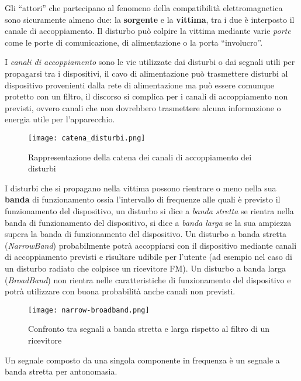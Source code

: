 Gli ``attori'' che partecipano al fenomeno della compatibilità elettromagnetica sono sicuramente
almeno due: la \textbf{sorgente} e la \textbf{vittima}, tra i due è interposto il canale di accoppiamento.
Il disturbo può colpire la vittima mediante varie \textit{porte} come le porte di comunicazione,
di alimentazione o la porta ``involucro''.

I \textit{canali di accoppiamento} sono le vie utilizzate dai disturbi o dai segnali utili per propagarsi tra i 
dispositivi, il cavo di alimentazione può trasmettere disturbi al dispositivo provenienti dalla rete di alimentazione
ma può essere comunque protetto con un filtro, il discorso si complica per i canali di accoppiamento non previsti,
ovvero canali che non dovrebbero trasmettere alcuna informazione o energia utile per l'apparecchio.

\begin{figure}[h]
 \texttt{[image: catena\_disturbi.png]}
 \centering
 \caption{Rappresentazione della catena dei canali di accoppiamento dei disturbi}
 \label{fig:catena_disturbi}
\end{figure}

I disturbi che si propagano nella vittima possono rientrare o meno nella sua \textbf{banda} di funzionamento
ossia l'intervallo di frequenze alle quali è previsto il funzionamento del dispositivo, un disturbo si dice
a \textit{banda stretta} se rientra nella banda di funzionamento del dispositivo, si dice a \textit{banda larga}
se la sua ampiezza supera la banda di funzionamento del dispositivo.
Un disturbo a banda stretta (\textit{NarrowBand}) probabilmente potrà accoppiarsi con il dispositivo mediante
canali di accoppiamento previsti e risultare udibile per l'utente (ad esempio nel caso di un disturbo radiato che colpisce
un ricevitore FM).
Un disturbo a banda larga (\textit{BroadBand}) non rientra nelle caratteristiche di funzionamento del dispositivo
e potrà utilizzare con buona probabilità anche canali non previsti.
\begin{figure}[h]
 \texttt{[image: narrow-broadband.png]}
 \centering
 \caption{Confronto tra segnali a banda stretta e larga rispetto al filtro di un ricevitore}
 \label{fig:narrow-broadband}
\end{figure}

Un segnale composto da una singola componente in frequenza è un segnale a banda stretta per antonomasia.






